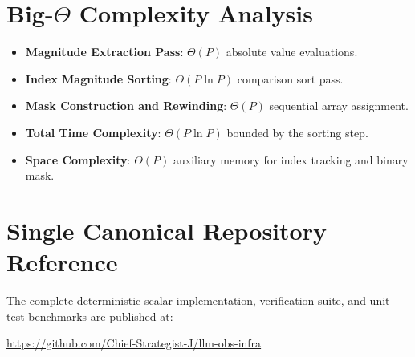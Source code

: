 \documentclass[11pt,a4paper]{article}
\theoremstyle{definition}
\begin{document}
\section{Big-$\Theta$ Complexity Analysis}

\begin{itemize}
    \item \textbf{Magnitude Extraction Pass}: $\Theta(P)$ absolute value evaluations.
    \item \textbf{Index Magnitude Sorting}: $\Theta(P \ln P)$ comparison sort pass.
    \item \textbf{Mask Construction and Rewinding}: $\Theta(P)$ sequential array assignment.
    \item \textbf{Total Time Complexity}: $\Theta(P \ln P)$ bounded by the sorting step.
    \item \textbf{Space Complexity}: $\Theta(P)$ auxiliary memory for index tracking and binary mask.
\end{itemize}

\section{Single Canonical Repository Reference}

The complete deterministic scalar implementation, verification suite, and unit test benchmarks are published at:
\begin{center}
\url{https://github.com/Chief-Strategist-J/llm-obs-infra}
\end{center}
\end{document}
